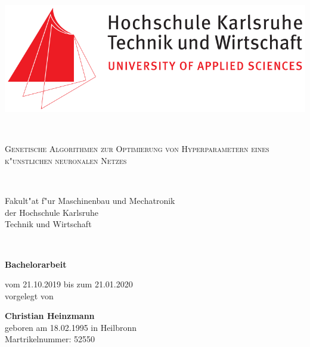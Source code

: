 \begin{titlepage}
\thispagestyle{empty}

\begin{center}
\begin{tabular}

\begin{center}
\includegraphics[scale=0.4]{img/Hska_logo.png}
\end{center}

\\

\begin{center}
\LARGE{\textsc{
Genetische Algorithmen zur Optimierung von Hyperparametern eines k"unstlichen neuronalen Netzes\\
}}
\end{center}

\\


\begin{center}
\large{Fakult"at f"ur Maschinenbau und Mechatronik \\
der Hochschule Karlsruhe \\
Technik und Wirtschaft \\}
\end{center}

\\

\begin{center}
\textbf{\Large{Bachelorarbeit}}
\end{center}


\begin{center}
vom 21.10.2019 bis zum 21.01.2020 \\
vorgelegt von
\end{center}

\begin{center}
\large{\textbf{Christian Heinzmann}} \\
\small{geboren am 18.02.1995 in Heilbronn} \\
\small{Martrikelnummer: 52550}
\end{center}


\end{tabular}
\end{center}
\end{titlepage}
